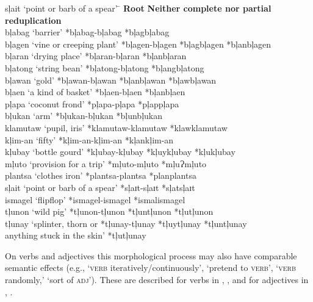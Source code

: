 \z
\ea
\label{ex:barrier}
\begin{tabbing}
sļait ‘point or barb of a spear’ \hspace{.15cm}\= \kill
\textbf{Root} \> \textbf{Neither complete nor partial reduplication} \\
bļabag ‘barrier’ \> *bļabag-bļabag *bļagbļabag \\
bļagen ‘vine or creeping plant’ \> *bļagen-bļagen *bļagbļagen *bļanbļagen \\
bļaran ‘drying place’ \> *bļaran-bļaran *bļanbļaran \\
bļatong ‘string bean’ \> *bļatong{}-bļatong *bļangbļatong \\
bļawan ‘gold’ \> *bļawan-bļawan *bļanbļawan *bļawbļawan \\
bļaen ‘a kind of basket’ \> *bļaen-bļaen *bļanbļaen \\
pļapa ‘coconut frond’ \> *pļapa-pļapa *pļappļapa \\
bļukan ‘arm’ \> *bļukan-bļukan *bļunbļukan \\
klamutaw ‘pupil, iris’ \> *klamutaw-klamutaw *klawklamutaw \\
kļim-an ‘fifty’ \> *kļim-an-kļim-an *kļankļim-an \\
kļubay ‘bottle gourd’ \> *kļubay-kļubay *kļuykļubay *kļukļubay \\
mļuto ‘provision for a trip’ \> *mļuto{}-mļuto *mļuɁmļuto \\
plantsa ‘clothes iron’ \> *plantsa-plantsa *planplantsa \\
sļait ‘point or barb of a spear’ \> *sļaɪt-sļaɪt *sļatsļaɪt \\
ismagel ‘flipflop’ \> *ismagel-ismagel *ismalismagel \\
tļunon ‘wild pig’ \> *tļunon-tļunon *tļuntļunon *tļutļunon \\
tļunay ‘splinter, thorn or  \> *tļunay-tļunay *tļuytļunay *tļuntļunay \\
anything stuck in the skin’ \> *tļutļunay
\end{tabbing}
\z

On verbs and adjectives this morphological process may also have comparable semantic effects (e.g., ‘\textsc{verb} iteratively/continuously’, ‘pretend to \textsc{verb}’, ‘\textsc{verb} randomly,’ ‘sort of \textsc{adj}’). These are described for verbs in , , and for adjectives in , .

